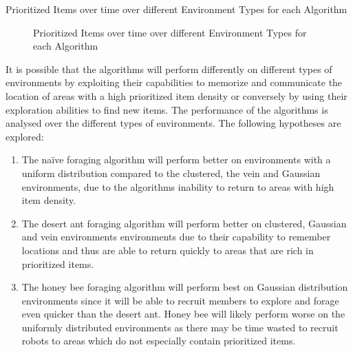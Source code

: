 \begin{table} [h]
     \caption{Prioritized Items over time over different Environment Types for each Algorithm}
     \label{ratio}
	\centering
	\footnotesize
	
\end{table}


\begin{figure}[!htb]
\centering
\resizebox{0.8\textwidth}{!}{}
\caption{Prioritized Items over time over different Environment Types for each Algorithm}
\label{environmenttypes}
\end{figure}


It is possible that the algorithms will perform differently on different types of environments by exploiting their capabilities to memorize and communicate the location of areas with a high prioritized item density or conversely by using their exploration abilities to find new items. The performance of the algorithms is analysed over the different types of environments. The following hypotheses are explored:  

\begin{enumerate}
	\item The na\"ive foraging algorithm will perform better on environments with a uniform distribution compared to the clustered, the vein and Gaussian environments, due to the algorithms inability to return to areas with high item density. 
	\item The desert ant foraging algorithm will perform better on clustered, Gaussian and vein environments environments due to their capability to remember locations and thus are able to return quickly to areas that are rich in prioritized items.
	 \item The honey bee foraging algorithm will perform best on Gaussian distribution environments since it will be able to recruit members to explore and forage even quicker than the desert ant. Honey bee will likely perform worse on the uniformly distributed environments as there may be time wasted to recruit robots to areas which do not especially contain prioritized items.
\end{enumerate}

